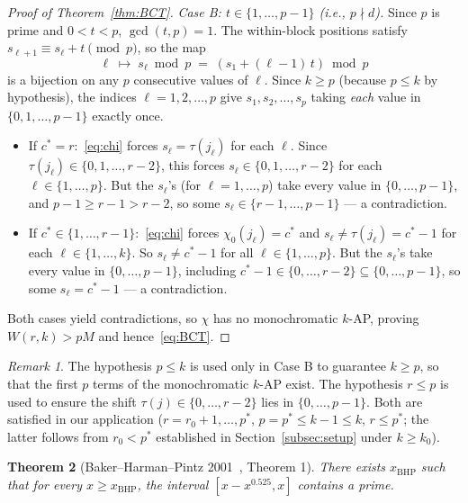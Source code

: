 \documentclass[11pt,reqno,a4paper]{amsart}
\theoremstyle{plain}
\newtheorem{theorem}{Theorem}[section]
\theoremstyle{definition}
\theoremstyle{remark}
\newtheorem{remark}[theorem]{Remark}
\numberwithin{equation}{section}
\begin{document}
\begin{proof}[Proof of Theorem~\ref{thm:BCT}]
\emph{Case B: $t\in\{1,\ldots,p-1\}$ (i.e., $p\nmid d$).} Since $p$
is prime and $0<t<p$, $\gcd(t,p)=1$. The within-block positions
satisfy $s_{\ell+1}\equiv s_{\ell}+t\pmod{p}$, so the map
\[
\ell\;\mapsto\;s_{\ell}\bmod p\;=\;(s_{1}+(\ell-1)\,t)\bmod p
\]
is a bijection on any $p$ consecutive values of $\ell$. Since
$k\ge p$ (because $p\le k$ by hypothesis), the indices
$\ell=1,2,\ldots,p$ give $s_{1},s_{2},\ldots,s_{p}$ taking
\emph{each} value in $\{0,1,\ldots,p-1\}$ exactly once.

\begin{itemize}
\item If $c^{*}=r$:~\eqref{eq:chi} forces $s_{\ell}=\tau(j_{\ell})$
  for each $\ell$. Since $\tau(j_{\ell})\in\{0,1,\ldots,r-2\}$, this
  forces $s_{\ell}\in\{0,1,\ldots,r-2\}$ for each
  $\ell\in\{1,\ldots,p\}$. But the $s_{\ell}$'s (for
  $\ell=1,\ldots,p$) take every value in $\{0,\ldots,p-1\}$, and
  $p-1\ge r-1>r-2$, so some $s_{\ell}\in\{r-1,\ldots,p-1\}$ ---
  a contradiction.
\item If $c^{*}\in\{1,\ldots,r-1\}$:~\eqref{eq:chi} forces
  $\chi_{0}(j_{\ell})=c^{*}$ and
  $s_{\ell}\ne\tau(j_{\ell})=c^{*}-1$ for each
  $\ell\in\{1,\ldots,k\}$. So $s_{\ell}\ne c^{*}-1$ for all
  $\ell\in\{1,\ldots,p\}$. But the $s_{\ell}$'s take every value in
  $\{0,\ldots,p-1\}$, including
  $c^{*}-1\in\{0,\ldots,r-2\}\subseteq\{0,\ldots,p-1\}$, so some
  $s_{\ell}=c^{*}-1$ --- a contradiction.
\end{itemize}

Both cases yield contradictions, so $\chi$ has no monochromatic
$k$-AP, proving $W(r,k)>pM$ and hence~\eqref{eq:BCT}.
\end{proof}

\begin{remark}
\label{rem:BCT-hyp}
The hypothesis $p\le k$ is used only in Case B to guarantee $k\ge p$,
so that the first $p$ terms of the monochromatic $k$-AP exist. The
hypothesis $r\le p$ is used to ensure the shift
$\tau(j)\in\{0,\ldots,r-2\}$ lies in $\{0,\ldots,p-1\}$. Both are
satisfied in our application ($r=r_{0}+1,\ldots,p^{*}$, $p=p^{*}\le k-1\le k$,
$r\le p^{*}$; the latter follows from $r_{0}<p^{*}$ established in
Section~\ref{subsec:setup} under $k\ge k_{0}$).
\end{remark}

\begin{theorem}[Baker--Harman--Pintz 2001~\cite{BHP}, Theorem 1]
\label{thm:bhp}
There exists $x_{\mathrm{BHP}}$ such that for every
$x\ge x_{\mathrm{BHP}}$, the interval $[x-x^{0.525},x]$ contains a
prime.
\end{theorem}
\end{document}

